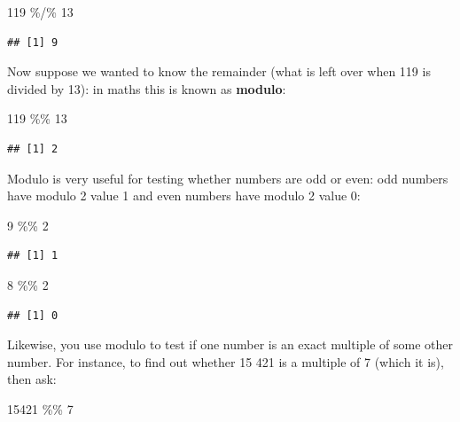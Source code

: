 \documentclass[
]{book}
\newenvironment{Shaded}{\begin{snugshade}}{\end{snugshade}}
\newcommand{\DecValTok}[1]{\textcolor[rgb]{0.00,0.00,0.81}{#1}}
\newcommand{\SpecialCharTok}[1]{\textcolor[rgb]{0.00,0.00,0.00}{#1}}
\begin{document}
\begin{Shaded}
\begin{Highlighting}[]
\DecValTok{119} \SpecialCharTok{\%/\%} \DecValTok{13}
\end{Highlighting}
\end{Shaded}

\begin{verbatim}
## [1] 9
\end{verbatim}

Now suppose we wanted to know the remainder (what is left over when 119 is divided by 13): in maths this is known as \textbf{modulo}:

\begin{Shaded}
\begin{Highlighting}[]
\DecValTok{119} \SpecialCharTok{\%\%} \DecValTok{13}
\end{Highlighting}
\end{Shaded}

\begin{verbatim}
## [1] 2
\end{verbatim}

Modulo is very useful for testing whether numbers are odd or even: odd numbers have modulo 2 value 1 and even numbers have modulo 2 value 0:

\begin{Shaded}
\begin{Highlighting}[]
\DecValTok{9} \SpecialCharTok{\%\%} \DecValTok{2}
\end{Highlighting}
\end{Shaded}

\begin{verbatim}
## [1] 1
\end{verbatim}

\begin{Shaded}
\begin{Highlighting}[]
\DecValTok{8} \SpecialCharTok{\%\%} \DecValTok{2}
\end{Highlighting}
\end{Shaded}

\begin{verbatim}
## [1] 0
\end{verbatim}

Likewise, you use modulo to test if one number is an exact multiple of some other number. For instance, to find out whether 15 421 is a multiple of 7 (which it is), then ask:

\begin{Shaded}
\begin{Highlighting}[]
\DecValTok{15421} \SpecialCharTok{\%\%} \DecValTok{7}
\end{Highlighting}
\end{Shaded}
\end{document}
